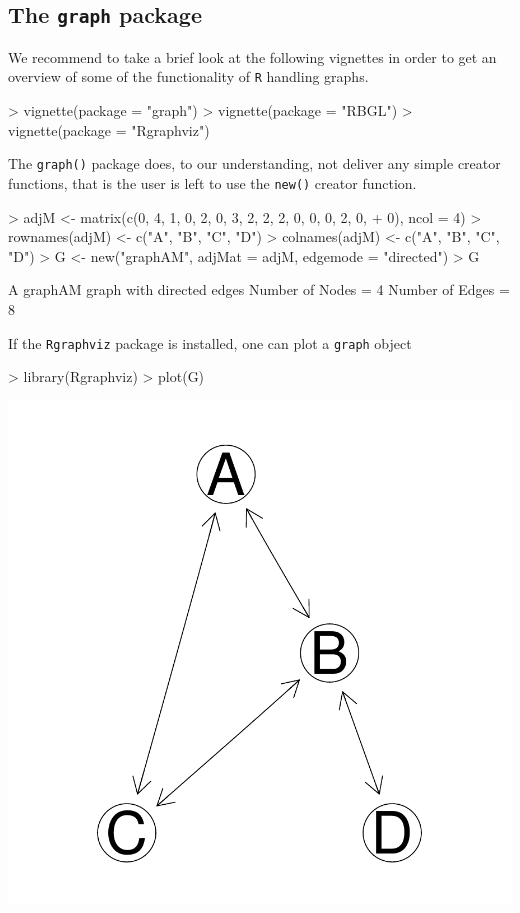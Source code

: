 \documentclass[12pt,oneside,titlepage,letter]{article}
\begin{document}
\subsection{The \texttt{graph} package}
We recommend to take a brief look at the following vignettes in order to get an overview of some of the functionality of \texttt{R} handling graphs.

\begin{Schunk}
\begin{Sinput}
> vignette(package = "graph")
> vignette(package = "RBGL")
> vignette(package = "Rgraphviz")
\end{Sinput}
\end{Schunk}

The \texttt{graph()} package does, to our understanding, not deliver any simple creator functions, that is the user is left to use the \texttt{new()} creator function.

\begin{Schunk}
\begin{Sinput}
> adjM <- matrix(c(0, 4, 1, 0, 2, 0, 3, 2, 2, 2, 0, 0, 0, 2, 0, 
+     0), ncol = 4)
> rownames(adjM) <- c("A", "B", "C", "D")
> colnames(adjM) <- c("A", "B", "C", "D")
> G <- new("graphAM", adjMat = adjM, edgemode = "directed")
> G
\end{Sinput}
\begin{Soutput}
A graphAM graph with directed edges
Number of Nodes = 4 
Number of Edges = 8 
\end{Soutput}
\end{Schunk}
If the \texttt{Rgraphviz} package is installed, one can plot a \texttt{graph} object 
\begin{center}
\begin{Schunk}
\begin{Sinput}
> library(Rgraphviz)
> plot(G)
\end{Sinput}
\end{Schunk}
\includegraphics{sweave_p-033}
\end{center}
\end{document}
